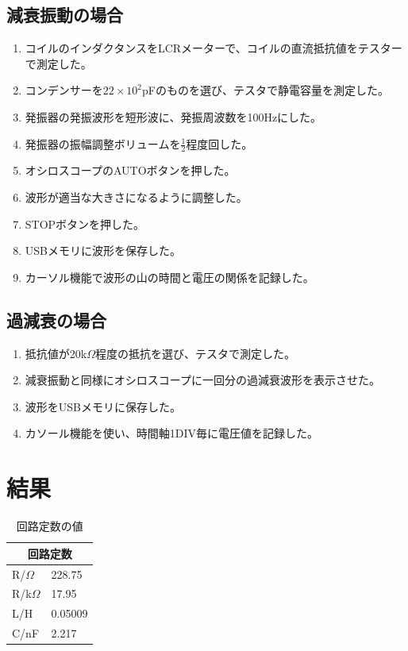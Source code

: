 \documentclass{jsarticle}
\begin{document}
\subsection{減衰振動の場合}
\begin{enumerate}
    \item コイルのインダクタンスをLCRメーターで、コイルの直流抵抗値をテスターで測定した。
    \item コンデンサーを$22\times10^2$pFのものを選び、テスタで静電容量を測定した。
    \item 発振器の発振波形を短形波に、発振周波数を100Hzにした。
    \item 発振器の振幅調整ボリュームを$\frac{1}{2}$程度回した。
    \item オシロスコープのAUTOボタンを押した。
    \item 波形が適当な大きさになるように調整した。
    \item STOPボタンを押した。
    \item USBメモリに波形を保存した。
    \item カーソル機能で波形の山の時間と電圧の関係を記録した。
\end{enumerate}

\subsection{過減衰の場合}
\begin{enumerate}
    \item 抵抗値が20k$\Omega$程度の抵抗を選び、テスタで測定した。
    \item 減衰振動と同様にオシロスコープに一回分の過減衰波形を表示させた。
    \item 波形をUSBメモリに保存した。
    \item カソール機能を使い、時間軸1DIV毎に電圧値を記録した。
\end{enumerate}    


\section{結果}

\begin{table}[H]
    \centering
    \caption{回路定数の値}
    \label{kairoteisuu}
    \begin{tabular}{ll}
    \hline
    \multicolumn{2}{c}{回路定数} \\ \hline
    R/$\Omega$    & 228.75     \\
    R/k$\Omega$     & 17.95      \\
    L/H        & 0.05009    \\
    C/nF       & 2.217     
    \end{tabular}
    \end{table}
\end{document}
